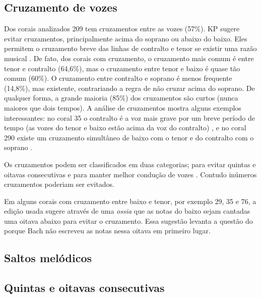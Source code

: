 \subsection{Cruzamento de vozes}
\label{sec:cruzamento-de-vozes}

Dos corais analizados 209 tem cruzamentos entre as vozes (57\%). KP
sugere evitar cruzamentos, principalmente acima do soprano ou abaixo
do baixo. Eles permitem o cruzamento breve das linhas de contralto e
tenor se existir uma razão musical \cite[p. 79]{kostka.ea00:tonal}. De
fato, dos corais com cruzamento, o cruzamento mais comum é entre tenor
e contralto (64,6\%), mas o cruzamento entre tenor e baixo é quase tão
comum (60\%). O cruzamento entre contralto e soprano é menos frequente
(14,8\%), mas existente, contrariando a regra de não cruzar acima do
soprano. De qualquer forma, a grande maioria (85\%) dos cruzamentos
são curtos (nunca maiores que dois tempos). A análise de cruzamentos
mostra alguns exemplos interessantes: no coral 35 o contralto é a voz
mais grave por um breve período de tempo (as vozes do tenor e baixo
estão acima da voz do contralto) , e no coral 290 existe um
cruzamento simultâneo de baixo com o tenor e do contralto com o
soprano .


Os cruzamentos podem ser classificados em duas categorias; para evitar
quintas e oitavas consecutivas  e para manter melhor
condução de vozes . Contudo inúmeros cruzamentos poderiam
ser evitados. 

Em alguns corais com cruzamento entre baixo e tenor, por exemplo 29,
35 e 76, a edição usada sugere através de uma \textit{ossia} que as
notas do baixo sejam cantadas uma oitava abaixo para evitar o
cruzamento. Essa sugestão levanta a questão do porque Bach não
escreveu as notas nessa oitava em primeiro lugar.

\subsection{Saltos melódicos}
\label{sec:saltos-melodicos}


\subsection{Quintas e oitavas consecutivas}
\label{sec:quintas-e-oitavas}


